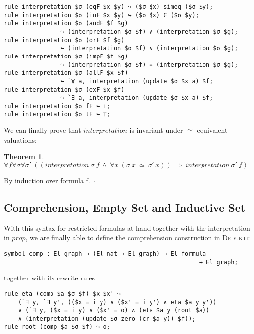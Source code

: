 \documentclass[submission,copyright,creativecommons]{eptcs}
\def\imp{\mathbin{\Rightarrow}}
\def\fa{{\forall}}
\def\conj{\mathbin{\wedge}}
\newtheorem{theorem}{Theorem}[section]
\newenvironment{proof}{\noindent {\em Proof.}}{\medskip}
\newcommand{\dedukti}{\textsc{Dedukti}}
\begin{document}
\begin{lstlisting}
rule interpretation $σ (eqF $x $y) ↪ ($σ $x) simeq ($σ $y);
rule interpretation $σ (inF $x $y) ↪ ($σ $x) ∈ ($σ $y);
rule interpretation $σ (andF $f $g)
                ↪ (interpretation $σ $f) ∧ (interpretation $σ $g);
rule interpretation $σ (orF $f $g)
                ↪ (interpretation $σ $f) ∨ (interpretation $σ $g);
rule interpretation $σ (impF $f $g)
                ↪ (interpretation $σ $f) ⇒ (interpretation $σ $g);
rule interpretation $σ (allF $x $f)
                ↪ `∀ a, interpretation (update $σ $x a) $f;
rule interpretation $σ (exF $x $f)
                ↪ `∃ a, interpretation (update $σ $x a) $f;
rule interpretation $σ fF ↪ ⊥;
rule interpretation $σ tF ↪ ⊤;
\end{lstlisting}

We can finally prove that $interpretation$ is invariant under $\simeq$-equivalent valuations:

\begin{theorem}
$\fa f \fa \sigma \fa \sigma' ~((interpretation \ \sigma \ f \ \conj \ \fa x ~(\sigma \ x \ \simeq \ \sigma' \ x)) \ \imp \ interpretation \ \sigma' \ f)$
\end{theorem}
\begin{proof}
By induction over formula f. $\square$
\end{proof}

\subsection{Comprehension, Empty Set and Inductive Set}

With this syntax for restricted formulas at hand together with the interpretation in $prop$, we are finally able to define the comprehension construction in \dedukti:

\begin{lstlisting}
symbol comp : El graph → (El nat → El graph) → El formula
                                                       → El graph;
\end{lstlisting}

together with its rewrite rules

\begin{lstlisting}
rule eta (comp $a $σ $f) $x $x' ↪ 
	(`∃ y, `∃ y', (($x = i y) ∧ ($x' = i y') ∧ eta $a y y')) 
	∨ (`∃ y, ($x = i y) ∧ ($x' = o) ∧ (eta $a y (root $a))
	∧ (interpretation (update $σ zero (cr $a y)) $f));
rule root (comp $a $σ $f) ↪ o;
\end{lstlisting}
\end{document}
